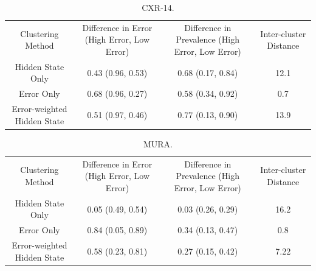 \documentclass{article}
\begin{document}
 \begin{table}[]
 \centering
\begin{tabular}{cccc}
 Clustering Method & Difference in Error (High Error, Low Error) & Difference in Prevalence (High Error, Low Error) & Inter-cluster Distance \\
 Hidden State Only & 0.43 (0.96, 0.53) & 0.68 (0.17, 0.84) & 12.1 \\
 Error Only & 0.68 (0.96, 0.27) & 0.58 (0.34, 0.92) & 0.7 \\
 Error-weighted Hidden State & 0.51 (0.97, 0.46) & 0.77 (0.13, 0.90) & 13.9
\end{tabular}
\label{tab:clustercxr14-1}
\caption{ CXR-14.}
\end{table}

 \begin{table}[]
 \centering
\begin{tabular}{cccc}
 Clustering Method & Difference in Error (High Error, Low Error) & Difference in Prevalence (High Error, Low Error) & Inter-cluster Distance \\
 Hidden State Only & 0.05 (0.49, 0.54) & 0.03 (0.26, 0.29) & 16.2 \\
 Error Only & 0.84 (0.05, 0.89) & 0.34 (0.13, 0.47) & 0.8 \\
 Error-weighted Hidden State & 0.58 (0.23, 0.81) & 0.27 (0.15, 0.42) & 7.22
\end{tabular}
\label{tab:clustermura-1}
\caption{ MURA.}
\end{table}
\end{document}
